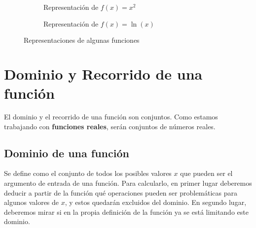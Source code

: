\documentclass[sans]{apuntes}
\begin{document}
\vspace{5mm}
\begin{figure}[h]
	\centering
	\begin{subfigure}[b]{0.45\linewidth}
		\centering
		\caption{Representación de $f(x) = x^2$}
		\label{fig:x^2}
	\end{subfigure}
	\hfill
	\begin{subfigure}[b]{0.45\linewidth}
		\centering
		\caption{Representación de $f(x) = \ln(x)$}
		\label{fig:x}
	\end{subfigure}
	\caption{Representaciones de algunas funciones}
	\label{fig:function-examples}
\end{figure}

\section{Dominio y Recorrido de una función} %
\label{sec:dominio-recorrido}
El dominio y el recorrido de una función son conjuntos. Como estamos trabajando con \textbf{funciones reales}, serán conjuntos de números reales.
\subsection{Dominio de una función}
Se define como el conjunto de todos los posibles valores $x$ que pueden ser el argumento de entrada de una función. Para calcularlo, en primer lugar deberemos deducir a partir de la función qué operaciones pueden ser problemáticas para algunos valores de $x$, y estos quedarán excluidos del dominio. En segundo lugar, deberemos mirar si en la propia definición de la función ya se está limitando este dominio.
\end{document}
